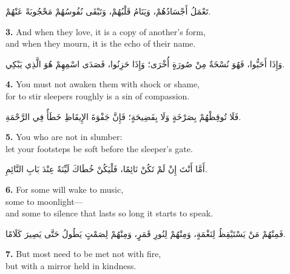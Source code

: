 \documentclass[11pt,a4paper,twoside]{book}
\begin{document}
\begin{flushright}
{\arabicfont
تَعْمَلُ أَجْسَادُهُمْ، وَيَنَامُ قَلْبُهُمْ،
وَتَبْقَى نُفُوسُهُمْ مَحْجُوبَةً عَنْهُمْ.}
\end{flushright}

\vspace{1em}
{\color{indigo}\bfseries 3.}\quad
And when they love, it is a copy of another's form,\\
and when they mourn, it is the echo of their name.

\begin{flushright}
{\arabicfont
وَإِذَا أَحَبُّوا، فَهُوَ نُسْخَةٌ مِنْ صُورَةٍ أُخْرَى؛
وَإِذَا حَزِنُوا، فَصَدَى اسْمِهِمْ هُوَ الَّذِي يَبْكِي.}
\end{flushright}

\vspace{1em}
{\color{indigo}\bfseries 4.}\quad
You must not awaken them with shock or shame,\\
for to stir sleepers roughly is a sin of compassion.

\begin{flushright}
{\arabicfont
فَلَا تُوقِظْهُمْ بِصَرْخَةٍ وَلَا بِفَضِيحَةٍ؛
فَإِنَّ جَفْوَةَ الإِيقَاظِ خَطَأٌ فِي الرَّحْمَةِ.}
\end{flushright}

\vspace{1em}
{\color{indigo}\bfseries 5.}\quad
You who are not in slumber:\\
let your footsteps be soft before the sleeper's gate.

\begin{flushright}
{\arabicfont
أَمَّا أَنْتَ إِنْ لَمْ تَكُنْ نَائِمًا،
فَلْيَكُنْ خُطَاكَ لَيِّنَةً عِنْدَ بَابِ النَّائِمِ.}
\end{flushright}

\vspace{1em}
{\color{indigo}\bfseries 6.}\quad
For some will wake to music,\\
some to moonlight—\\
and some to silence that lasts so long it starts to speak.

\begin{flushright}
{\arabicfont
فَمِنْهُمْ مَنْ يَسْتَيْقِظُ لِنَغْمَةٍ،
وَمِنْهُمْ لِنُورِ قَمَرٍ،
وَمِنْهُمْ لِصَمْتٍ يَطُولُ حَتَّى يَصِيرَ كَلَامًا.}
\end{flushright}

\vspace{1em}
{\color{indigo}\bfseries 7.}\quad
But most need to be met not with fire,\\
but with a mirror held in kindness.
\end{document}
